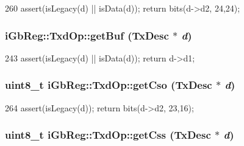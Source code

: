 \begin{DoxyCode}
260 { assert(isLegacy(d) || isData(d)); return bits(d->d2, 24,24); }
\end{DoxyCode}
\hypertarget{namespaceiGbReg_1_1TxdOp_a363e2b2f2f55fcc8bdd1291609cc48db}{
\subsubsection[{getBuf}]{ iGbReg::TxdOp::getBuf (TxDesc $\ast$ {\em d})}}
\label{namespaceiGbReg_1_1TxdOp_a363e2b2f2f55fcc8bdd1291609cc48db}



\begin{DoxyCode}
243 { assert(isLegacy(d) || isData(d)); return d->d1; }
\end{DoxyCode}
\hypertarget{namespaceiGbReg_1_1TxdOp_ac61cebaf6df237614790bbd1f2376c38}{
\subsubsection[{getCso}]{\setlength{\rightskip}{0pt plus 5cm}uint8\_\-t iGbReg::TxdOp::getCso (TxDesc $\ast$ {\em d})}}
\label{namespaceiGbReg_1_1TxdOp_ac61cebaf6df237614790bbd1f2376c38}



\begin{DoxyCode}
264 { assert(isLegacy(d)); return bits(d->d2, 23,16); }
\end{DoxyCode}
\hypertarget{namespaceiGbReg_1_1TxdOp_a81448192c44c2e6d07bdf88aecdb7afe}{
\subsubsection[{getCss}]{\setlength{\rightskip}{0pt plus 5cm}uint8\_\-t iGbReg::TxdOp::getCss (TxDesc $\ast$ {\em d})}}
\label{namespaceiGbReg_1_1TxdOp_a81448192c44c2e6d07bdf88aecdb7afe}



